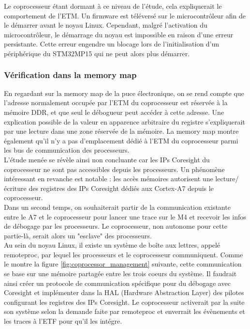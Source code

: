 Le coprocesseur étant dormant à ce niveau de l'étude, cela expliquerait le
comportement de l'ETM. Un firmware est téléversé sur le microcontrôleur afin
de le démarrer avant le noyau Linux. Cependant, malgré l'activation du
microcontrôleur, le démarrage du noyau est impossible en raison d'une erreur
persistante. Cette erreur engendre un blocage lors de l'initialisation d'un
périphérique du STM32MP15 qui ne peut alors plus démarrer.

\subsubsection{Vérification dans la memory map}
\label{sec:mmap}

En regardant sur la memory map de la puce électronique, on se rend compte que
l'adresse normalement occupée par l'ETM du coprocesseur est réservée à la
mémoire DDR, et que seul le débogueur peut accéder à cette adresse. Une
explication possible de la valeur en apparence arbitraire du registre
s'expliquerait par une lecture dans une zone réservée de la mémoire. La memory
map montre également qu'il n'y a pas d'emplacement dédié à l'ETM du
coprocesseur parmi les bus de communication des processeurs. \\

L'étude menée se révèle ainsi non concluante car les IPs Coresight du
coprocesseur ne sont pas accessibles depuis les processeurs. Un phénomène
intéressant en revanche est notable : les accès mémoires autorisent une
lecture/écriture des registres des IPs Coresight dédiés aux Cortex-A7 depuis
le coprocesseur.  \\

Dans un second temps, on souhaiterait partir de la communication existante
entre le A7 et le coprocesseur pour lancer une trace sur le M4 et recevoir les
infos de débogage par les processeurs. Le coprocesseur, non autonome pour
cette partie-là, serait alors un "esclave" des processeurs. \\

Au sein du noyau Linux, il existe un système de boîte aux lettres, appelé
remoteproc, par lequel les processeurs et le coprocesseur communiquent.  Comme
le montre la figure \ref{fig:coprocessor_management} suivante, cette
communication se base sur une mémoire partagée entre les trois coeurs du
système. Il faudrait ainsi créer un protocole de communication spécifique pour
du débogage avec Coresight et implémenter dans la HAL (Hardware Abstraction
Layer) des pilotes configurant les registres des IPs Coresight. Le
coprocesseur activerait par la suite son système selon la demande faite par
remoteproc et enverrait les évènements et les traces à l'ETF pour qu'il les
intégre. \\

